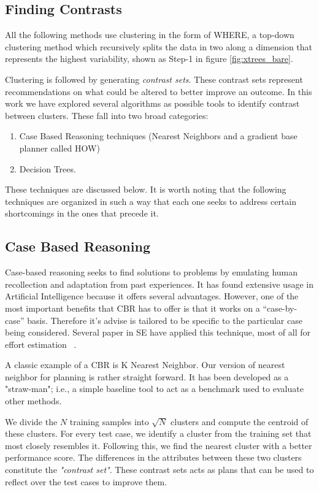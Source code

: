 \documentclass{sig-alternate}
\begin{document}
\subsection{Finding Contrasts}
All the following methods use clustering in the form of WHERE, a top-down clustering method which recursively splits the data in two along a dimension that represents the highest variability, shown as Step-1 in figure \ref{fig:xtrees_bare}. 

Clustering is followed by generating \textit{contrast sets}. These contrast sets represent recommendations on what could be altered to better improve an outcome. In this work we have explored several algorithms as possible tools to identify contrast between clusters. These fall into two broad categories:
\begin{enumerate}
\item Case Based Reasoning techniques (Nearest Neighbors and a gradient base planner called HOW)
\item Decision Trees.
\end{enumerate}

These techniques are discussed below. It is worth noting that the following techniques are organized in such a way that each one seeks to address certain shortcomings in the ones that precede it. 

\subsection{Case Based Reasoning}

Case-based reasoning seeks to find solutions to problems by emulating human recollection and adaptation from past experiences. It has found extensive usage in Artificial Intelligence because it offers several advantages. However, one of the most important benefits that CBR has to offer is that it works on a ``case-by-case'' basis. Therefore it's advise is tailored to be specific to the particular case being considered. Several paper in SE have applied this technique, most of all for effort estimation ~\cite{keung2008analogy, 6600685, walkerden1999empirical, shepperd1997estimating, kocaguneli2010use}. 

A classic example of a CBR is K Nearest Neighbor. Our version of nearest neighbor for planning is rather straight forward. It has been developed as a "straw-man"; i.e., a simple baseline tool to act as a benchmark used to evaluate other methods. 

We divide the $N$ training samples into $\sqrt{N}$ clusters and compute the centroid of these clusters. For every test case, we identify a cluster from the training set that most closely resembles it. Following this, we find the nearest cluster with a better performance score. The differences in the attributes between these two clusters constitute the \textit{"contrast set"}. These contrast sets acts as plans that can be used to reflect over the test cases to improve them.
\end{document}
